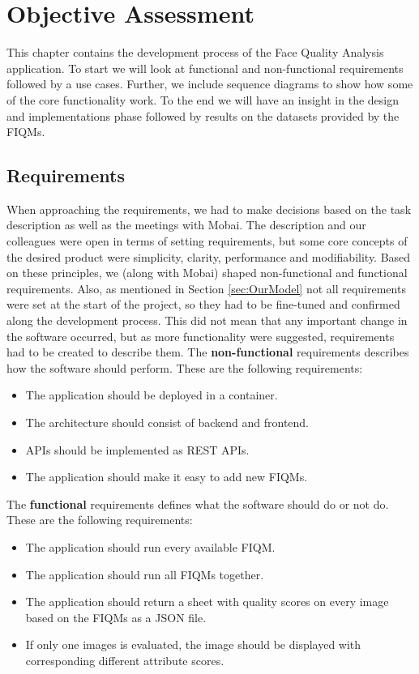 \chapter{Objective Assessment}
\label{chap:objective}
This chapter contains the development process of the Face Quality Analysis application. To start we will look at functional and non-functional requirements followed by a use cases. Further, we include sequence diagrams to show how some of the core functionality work. To the end we will have an insight in the design and implementations phase followed by results on the datasets provided by the FIQMs.

\section{Requirements}
When approaching the requirements, we had to make decisions based on the task description  as well as the meetings with Mobai. The description and our colleagues were open in terms of setting requirements, but some core concepts of the desired product were simplicity, clarity, performance and modifiability. Based on these principles, we (along with Mobai) shaped non-functional and functional requirements. Also, as mentioned in Section \ref{sec:OurModel} not all requirements were set at the start of the project, so they had to be fine-tuned and confirmed along the development process. This did not mean that any important change in the software occurred, but as more functionality were suggested, requirements had to be created to describe them. The \textbf{non-functional} requirements describes how the software should perform. These are the following requirements:
\begin{itemize}
    \item The application should be deployed in a container.
    \item The architecture should consist of backend and frontend.
    \item APIs should be implemented as REST APIs.
    \item The application should make it easy to add new FIQMs.
\end{itemize}
The \textbf{functional} requirements defines what the software should do or not do. These are the following requirements:
\begin{itemize}
    \item The application should run every available FIQM.
    \item The application should run all FIQMs together.
    \item The application should return a sheet with quality scores on every image based on the FIQMs as a JSON file.
    \item If only one images is evaluated, the image should be displayed with corresponding different attribute scores. 
\end{itemize}


